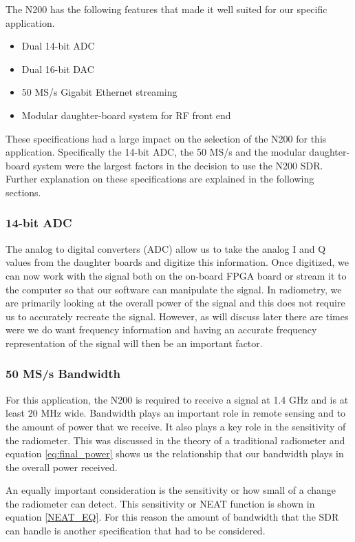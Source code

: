 The N200 has the following features that made it well suited for our specific application.

\begin{itemize}
\item Dual 14-bit ADC
\item Dual 16-bit DAC
\item 50 MS/s Gigabit Ethernet streaming
\item Modular daughter-board system for RF front end
\end{itemize}

These specifications had a large impact on the selection of the N200 for this application.  Specifically the 14-bit ADC, the 50 MS/s and the modular daughter-board system were the largest factors in the decision to use the N200 SDR.  Further explanation on these specifications are explained in the following sections.

\subsubsection{14-bit ADC}
The analog to digital converters (ADC) allow us to take the analog I and Q values from the daughter boards and digitize this information.  Once digitized, we can now work with the signal both on the on-board FPGA board or stream it to the computer so that our software can manipulate the signal.  In radiometry, we are primarily looking at the overall power of the signal and this does not require us to accurately recreate the signal.  However, as will discuss later there are times were we do want frequency information and having an accurate frequency representation of the signal will then be an important factor.

\subsubsection{50 MS/s Bandwidth}
For this application, the N200 is required to receive a signal at 1.4 GHz and is at least 20 MHz wide.  Bandwidth plays an important role in remote sensing and to the amount of power that we receive.  It also plays a key role in the sensitivity of the radiometer.  This was discussed in the theory of a traditional radiometer and equation \ref{eq:final_power} shows us the relationship that our bandwidth plays in the overall power received.    

An equally important consideration is the sensitivity or how small of a change the radiometer can detect.  This sensitivity or NEAT function is shown in equation \ref{NEAT_EQ}.  For this reason the amount of bandwidth that the SDR can handle is another specification that had to be considered.  

